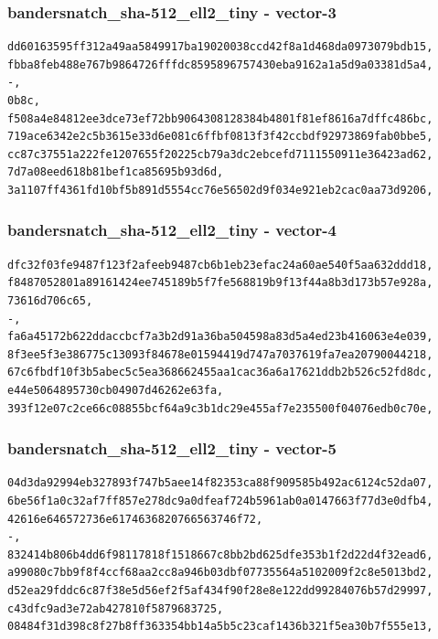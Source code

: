 \documentclass[
]{article}
\begin{document}
\subsubsection{bandersnatch\_sha-512\_ell2\_tiny -
vector-3}\label{bandersnatch_sha-512_ell2_tiny---vector-3}

\begin{verbatim}
dd60163595ff312a49aa5849917ba19020038ccd42f8a1d468da0973079bdb15,
fbba8feb488e767b9864726fffdc8595896757430eba9162a1a5d9a03381d5a4,
-,
0b8c,
f508a4e84812ee3dce73ef72bb9064308128384b4801f81ef8616a7dffc486bc,
719ace6342e2c5b3615e33d6e081c6ffbf0813f3f42ccbdf92973869fab0bbe5,
cc87c37551a222fe1207655f20225cb79a3dc2ebcefd7111550911e36423ad62,
7d7a08eed618b81bef1ca85695b93d6d,
3a1107ff4361fd10bf5b891d5554cc76e56502d9f034e921eb2cac0aa73d9206,
\end{verbatim}

\subsubsection{bandersnatch\_sha-512\_ell2\_tiny -
vector-4}\label{bandersnatch_sha-512_ell2_tiny---vector-4}

\begin{verbatim}
dfc32f03fe9487f123f2afeeb9487cb6b1eb23efac24a60ae540f5aa632ddd18,
f8487052801a89161424ee745189b5f7fe568819b9f13f44a8b3d173b57e928a,
73616d706c65,
-,
fa6a45172b622ddaccbcf7a3b2d91a36ba504598a83d5a4ed23b416063e4e039,
8f3ee5f3e386775c13093f84678e01594419d747a7037619fa7ea20790044218,
67c6fbdf10f3b5abec5c5ea368662455aa1cac36a6a17621ddb2b526c52fd8dc,
e44e5064895730cb04907d46262e63fa,
393f12e07c2ce66c08855bcf64a9c3b1dc29e455af7e235500f04076edb0c70e,
\end{verbatim}

\subsubsection{bandersnatch\_sha-512\_ell2\_tiny -
vector-5}\label{bandersnatch_sha-512_ell2_tiny---vector-5}

\begin{verbatim}
04d3da92994eb327893f747b5aee14f82353ca88f909585b492ac6124c52da07,
6be56f1a0c32af7ff857e278dc9a0dfeaf724b5961ab0a0147663f77d3e0dfb4,
42616e646572736e6174636820766563746f72,
-,
832414b806b4dd6f98117818f1518667c8bb2bd625dfe353b1f2d22d4f32ead6,
a99080c7bb9f8f4ccf68aa2cc8a946b03dbf07735564a5102009f2c8e5013bd2,
d52ea29fddc6c87f38e5d56ef2f5af434f90f28e8e122dd99284076b57d29997,
c43dfc9ad3e72ab427810f5879683725,
08484f31d398c8f27b8ff363354bb14a5b5c23caf1436b321f5ea30b7f555e13,
\end{verbatim}
\end{document}
